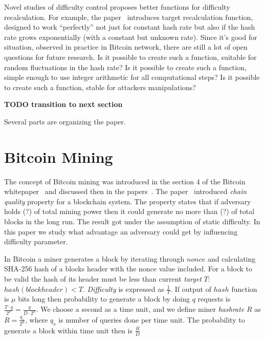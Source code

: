 \documentclass[]{llncs}
\begin{document}
Novel studies of difficulty control proposes better functions for difficulty recalculation.
For example, the paper~\cite{kraft2015difficulty} introduces target recalculation function, designed to work “perfectly” not just for constant hash rate but also if the hash rate grows exponentially (with a constant but unknown rate).
Since it's good for situation, observed in practice in Bitcoin network, there are still a lot of open questions for future research.
Is it possible to create such a function, suitable for random fluctuations in the hash rate?
Is it possible to create such a function, simple enough to use integer arithmetic for all computational steps?
Is it possible to create such a function, stable for attackers manipulations?

\textbf{TODO transition to next section}

Several parts are organizing the paper. 

\section{Bitcoin Mining}
\label{sec:bit}

The concept of Bitcoin mining was introduced in the section 4 of the Bitcoin whitepaper~\cite{Nakamoto2008} and discussed then in the papers~\cite{kraft2015difficulty, miller2014permacoin, eyal2014majority, garay2015bitcoin}. The paper~\cite{garay2015bitcoin} introduced \textit{chain quality} property for a blockchain system. The property states that if adversary holds (?) of total mining power then it could generate no more than (?) of total blocks in the long run. The result got under the assumption of static difficulty. In this paper we study what advantage an adversary could get by influencing difficulty parameter.

In Bitcoin a miner generates a block by iterating through \(nonce\) and calculating SHA-256 hash of a blocks header with the nonce value included.
For a block to be valid the hash of its header must be less than current \textit{target} \(T\): \( hash(blockheader) < T \). \textit{Difficulty} is expressed as \(\frac{1}{T}\). If output of \(hash\) function is \(\mu\) bits long then probability to generate a block by doing \(q\) requests is \(\frac{T \cdot q}{2^\mu} = \frac{q}{D \cdot 2^\mu}\). We choose a second as a time unit, and we define miner \textit{hashrate} \(R\) as \(R = \frac{q_s}{2^\mu}\), where \(q_s\) is number of queries done per time unit. The probability to generate a block within time unit then is \(\frac{R}{D}\)
\end{document}
